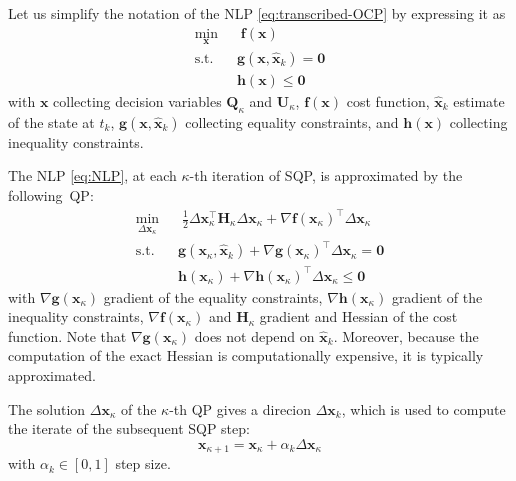 Let us simplify the notation of the NLP \eqref{eq:transcribed-OCP}
by expressing it as
\begin{equation}
    \label{eq:NLP}
    \begin{aligned}
        \min_{\bm{x}} \;\;
            & \; \bm{f}(\bm{x}) \\
            \text{s.t. } & \bm{g}(\bm{x}, \hat{\bm{x}}_k) = \bm{0} \\
                         & \bm{h}(\bm{x}) \le \bm{0}
    \end{aligned}
\end{equation}
with $\bm{x}$ collecting decision variables $\bm{Q}_{\kappa}$ and $\bm{U}_{\kappa}$,
$\bm{f}(\bm{x})$ cost function,
$\hat{\bm{x}}_k$ estimate of the state at $t_k$,
$\bm{g}(\bm{x}, \hat{\bm{x}}_k)$ collecting equality
constraints, and $\bm{h}(\bm{x})$ collecting inequality constraints.

The NLP \eqref{eq:NLP}, at each $\kappa$-th iteration of SQP, is approximated 
by the following~QP:
\begin{equation}
    \label{eq:QP}
    \begin{aligned}
        \min_{\Delta \bm{x}_{\kappa}} \;\;
            & \; \frac{1}{2} \Delta \bm{x}_{\kappa}^\top \bm{H}_{\kappa} \Delta \bm{x}_{\kappa} + \nabla \bm{f}(\bm{x}_{\kappa})^\top \Delta \bm{x}_{\kappa}  \\
            \text{s.t. } & \bm{g}(\bm{x}_{\kappa}, \hat{\bm{x}}_k) + \nabla \bm{g}({\bm{x}_{\kappa}})^\top \Delta \bm{x}_{\kappa}   = \bm{0} \\
                         & \bm{h}(\bm{x}_{\kappa}) + \nabla \bm{h}({\bm{x}_{\kappa}})^\top \Delta \bm{x}_{\kappa} \le \bm{0}
    \end{aligned}
\end{equation}
with $\nabla \bm{g}({\bm{x}_{\kappa}})$ gradient of the equality constraints,
$\nabla \bm{h}({\bm{x}_{\kappa}})$ gradient of the inequality constraints,
$\nabla \bm{f}(\bm{x}_{\kappa})$ and $\bm{H}_{\kappa}$ gradient and Hessian
of the cost function. Note that $\nabla \bm{g}({\bm{x}_{\kappa}})$ does not 
depend on $\hat{\bm{x}}_k$. Moreover, because the computation of the exact Hessian is 
computationally expensive, it is typically approximated.

The solution $\Delta \bm{x}_{\kappa}$ of the $\kappa$-th QP gives a direcion $\Delta \bm{x}_k$, which is 
used to compute the iterate of the subsequent SQP step:
\begin{equation}
    \label{eq:SQP-Newton-step}
    \bm{x}_{\kappa+1} = \bm{x}_{\kappa} + \alpha_k \Delta \bm{x}_{\kappa}
\end{equation}
with $\alpha_k \in [0, 1]$ step size.

